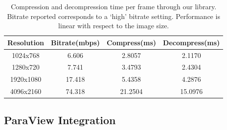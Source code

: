 \documentclass{vgtc}                          %
\begin{document}

%

\begin{table}[h]
  \vspace{2.5mm}
  \caption{Compression and decompression time per frame through our
  library.  Bitrate reported corresponds to a `high' bitrate setting.
  Performance is linear with respect to the image size.}
  \vspace{-4mm}
  \label{tab:experiment_setup}
  \scriptsize
  \begin{center}
    \begin{tabular}{cccc}
      Resolution & Bitrate(mbps) & Compress(ms) & Decompress(ms)\\
    \hline
      1024x768 & 6.606 & 2.8057 & 2.1170\\
      1280x720 & 7.741 & 3.4793 & 2.4304\\
      1920x1080 & 17.418 & 5.4358 & 4.2876\\
      4096x2160 & 74.318 & 21.2504 & 15.0976
    \end{tabular}
  \end{center}
  \vspace{-6mm}
\end{table}

\subsection{ParaView Integration}

\end{document}
